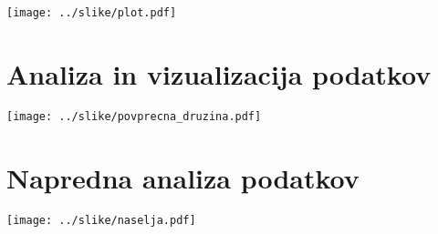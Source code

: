 \documentclass[11pt,a4paper]{article}
\begin{document}
\texttt{[image: ../slike/plot.pdf]}


\section{Analiza in vizualizacija podatkov}

\texttt{[image: ../slike/povprecna\_druzina.pdf]}

\section{Napredna analiza podatkov}

\texttt{[image: ../slike/naselja.pdf]}
\end{document}
